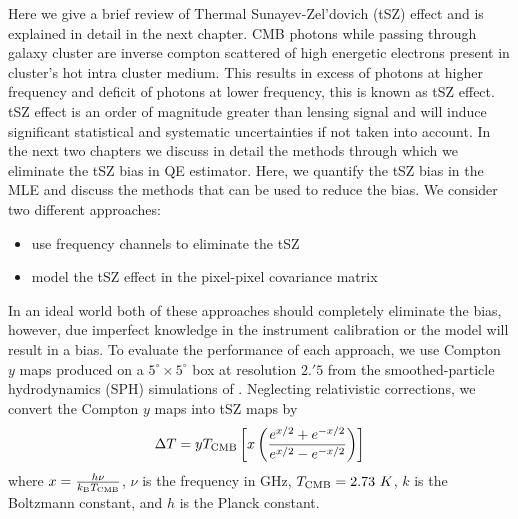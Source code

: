Here we give a brief review of Thermal Sunayev-Zel'dovich (tSZ) effect and is explained in detail in the next chapter.
CMB photons while passing through galaxy cluster are inverse compton scattered of high energetic electrons present in cluster's hot intra cluster medium.
This results in excess of photons at higher frequency and deficit of photons at lower frequency, this is known as tSZ effect.
tSZ effect is an order of magnitude greater than lensing signal and will induce significant statistical and systematic uncertainties if not taken into account.
In the next two chapters we discuss in detail the methods through which we eliminate the tSZ bias in QE estimator.
Here, we quantify the tSZ bias in the MLE and discuss the methods that can be used to reduce the bias.
We consider two different approaches:
\begin{itemize}
\item use frequency channels to eliminate the tSZ
\item model the tSZ effect in the pixel-pixel covariance matrix
\end{itemize}
In an ideal world both of these approaches should completely eliminate the bias, however, due imperfect knowledge in the instrument calibration or the model will result in a bias. 
To evaluate the performance of each approach,  we use Compton $y$ maps produced on a $5^{\circ} \times 5^{\circ}$ box at resolution $2.'5$ from the smoothed-particle hydrodynamics (SPH) simulations of  \citet{mccarthy2013}.
Neglecting relativistic corrections, we convert the Compton $y$ maps into tSZ maps by
\begin{eqnarray}
\Delta T = y T_{\rm CMB} \left[x \left(\frac{e^{x/2} + e^{-x/2}}{e^{x/2} - e^{-x/2}}  \right)\right]
\end{eqnarray} where $x = \frac{h\nu}{k_{\rm B}T_{\rm CMB}}$, $\nu$ is the frequency in GHz, $T_{\rm CMB} = 2.73\ K$, $k$ is the Boltzmann constant, and $h$ is the Planck constant.

